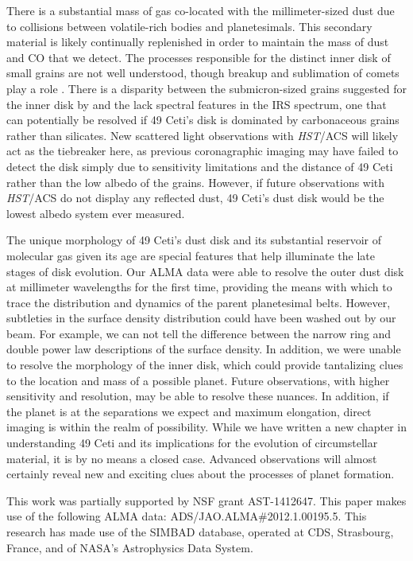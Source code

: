 There is a substantial mass of gas co-located with the millimeter-sized dust due to collisions between volatile-rich bodies and planetesimals. This secondary material is likely continually replenished in order to maintain the mass of dust and CO that we detect. The processes responsible for the distinct inner disk of small grains are not well understood, though breakup and sublimation of comets play a role \citep{Wahh07}. There is a disparity between the submicron-sized grains suggested for the inner disk by \citeauthor{Wahh07} and the lack spectral features in the IRS spectrum, one that can potentially be resolved if 49 Ceti's disk is dominated by carbonaceous grains rather than silicates. New scattered light observations with \textit{HST}/ACS will likely act as the tiebreaker here, as previous coronagraphic imaging may have failed to detect the disk simply due to sensitivity limitations and the distance of 49 Ceti rather than the low albedo of the grains. However, if future observations with \textit{HST}/ACS do not display any reflected dust, 49 Ceti's dust disk would be the lowest albedo system ever measured. 


The unique morphology of 49 Ceti's dust disk and its substantial reservoir of molecular gas given its age are special features that help illuminate the late stages of disk evolution. Our ALMA data were able to resolve the outer dust disk at millimeter wavelengths for the first time, providing the means with which to trace the distribution and dynamics of the parent planetesimal belts. However, subtleties in the surface density distribution could have been washed out by our beam. For example, we can not tell the difference between the narrow ring and double power law descriptions of the surface density. In addition, we were unable to resolve the morphology of the inner disk, which could provide tantalizing clues to the location and mass of a possible planet. Future observations, with higher sensitivity and resolution, may be able to resolve these nuances. In addition, if the planet is at the separations we expect and maximum elongation, direct imaging is within the realm of possibility. While we have written a new chapter in understanding 49 Ceti and its implications for the evolution of circumstellar material, it is by no means a closed case. Advanced observations will almost certainly reveal new and exciting clues about the processes of planet formation.


\medskip
\bigskip\bigskip
\bigskip
This work was partially supported by NSF grant AST-1412647. This paper makes use of the following ALMA data: ADS/JAO.ALMA\#2012.1.00195.5. This research has made use of the SIMBAD database, operated at CDS, Strasbourg, France, and of NASA's Astrophysics Data System. 
